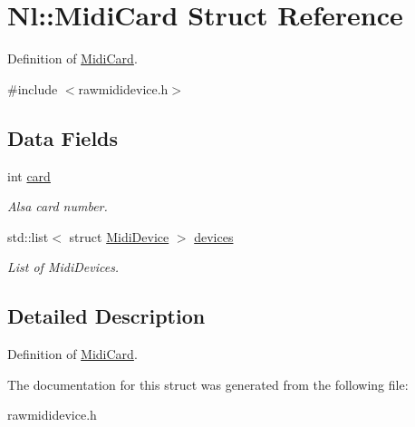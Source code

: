 \hypertarget{structNl_1_1MidiCard}{\section{Nl\-:\-:Midi\-Card Struct Reference}
\label{structNl_1_1MidiCard}
}


Definition of \hyperlink{structNl_1_1MidiCard}{Midi\-Card}.  




{\ttfamily \#include $<$rawmididevice.\-h$>$}

\subsection*{Data Fields}
\begin{DoxyCompactItemize}
\item 
\hypertarget{structNl_1_1MidiCard_a626b4accca3902d3499ddbd1c5d5172d}{int \hyperlink{structNl_1_1MidiCard_a626b4accca3902d3499ddbd1c5d5172d}{card}}\label{structNl_1_1MidiCard_a626b4accca3902d3499ddbd1c5d5172d}

\begin{DoxyCompactList}\small\item\em Alsa card number. \end{DoxyCompactList}\item 
\hypertarget{structNl_1_1MidiCard_abed00289643bf14ca00ac566a42087c9}{std\-::list$<$ struct \hyperlink{structNl_1_1MidiDevice}{Midi\-Device} $>$ \hyperlink{structNl_1_1MidiCard_abed00289643bf14ca00ac566a42087c9}{devices}}\label{structNl_1_1MidiCard_abed00289643bf14ca00ac566a42087c9}

\begin{DoxyCompactList}\small\item\em List of Midi\-Devices. \end{DoxyCompactList}\end{DoxyCompactItemize}


\subsection{Detailed Description}
Definition of \hyperlink{structNl_1_1MidiCard}{Midi\-Card}. 

The documentation for this struct was generated from the following file\-:\begin{DoxyCompactItemize}
\item 
rawmididevice.\-h\end{DoxyCompactItemize}
